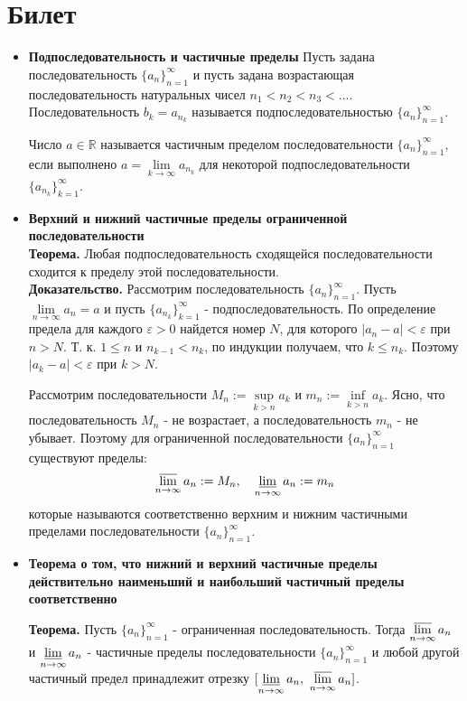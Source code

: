 \documentclass[12pt,a4paper]{article}
\begin{document}
\section{Билет}
\begin{itemize}

\item \textbf{ Подпоследовательность и частичные пределы}
Пусть задана последовательность $\{a_n\}_{n=1}^\infty$ и пусть задана возрастающая последовательность натуральных чисел $n_1 < n_2 < n_3 < \ldots$. Последовательность $b_k = a_{n_k}$ называется подпоследовательностью $\{a_n\}_{n=1}^\infty$.

Число $a \in \mathbb{R}$ называется частичным пределом последовательности $\{a_n\}_{n=1}^\infty$, если выполнено $a = \lim\limits_{k \to \infty}{a_{n_k}}$ для некоторой подпоследовательности $\{a_{n_k}\}_{k=1}^\infty$.

\item \textbf{Верхний и нижний частичные пределы ограниченной последовательности} \\
\textbf{Теорема.} Любая подпоследовательность сходящейся последовательности сходится к пределу этой последовательности. \\
\textbf{Доказательство.}
Рассмотрим последовательность $\{a_n\}_{n=1}^\infty$. Пусть $\lim\limits_{n \to \infty}{a_n} = a$ и пусть $\{a_{n_k}\}_{k=1}^\infty$ - подпоследовательность. По определение предела для каждого $\varepsilon > 0$ найдется номер $N$, для которого $|a_n - a| < \varepsilon$ при $n > N$. Т. к. $1 \leq n$ и $n_{k-1} < n_k$, по индукции получаем, что $k \leq n_k$. Поэтому $|a_k - a| < \varepsilon$ при $k > N$.

Рассмотрим последовательности $M_n := \sup\limits_{k>n}{a_k}$ и $m_n := \inf\limits_{k>n}{a_k}$. Ясно, что последовательность $M_n$ - не возрастает, а последовательность $m_n$ - не убывает. Поэтому для ограниченной последовательности $\{a_n\}_{n=1}^\infty$ существуют пределы:
\[
    \varlimsup_{n \to \infty}{a_n} := M_n 
    ,\ \ \
    \varliminf_{n \to \infty}{a_n} := m_n 
\]
которые называются соответственно верхним и нижним частичными пределами последовательности $\{a_n\}_{n=1}^\infty$.

\item\textbf{ Теорема о том, что нижний и верхний частичные пределы действительно наименьший и наибольший частичный пределы соответственно}

\textbf{Теорема.} 
Пусть $\{a_n\}_{n=1}^\infty$ - ограниченная последовательность. Тогда $\varlimsup\limits_{n \to \infty}{a_n}$ и $\varliminf\limits_{n \to \infty}{a_n}$  - частичные пределы последовательности $\{a_n\}_{n=1}^\infty$ и любой другой частичный предел принадлежит отрезку $[\varliminf\limits_{n \to \infty}{a_n},\ \varlimsup\limits_{n \to \infty}{a_n}]$.


\end{itemize}
\end{document}
